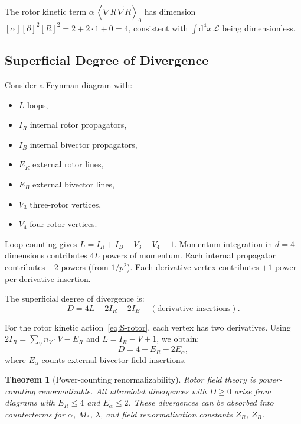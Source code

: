 \documentclass[11pt,a4paper]{article}
\numberwithin{equation}{section}
\theoremstyle{plain}
\newtheorem{theorem}{Theorem}[section]
\theoremstyle{definition}
\theoremstyle{remark}
\newcommand{\dd}{\mathrm{d}}
\newcommand{\rev}[1]{\widetilde{#1}}        %
\newcommand{\grade}[2]{\left\langle #1 \right\rangle_{#2}}
\newcommand{\Lag}{\mathcal{L}}              %
\begin{document}
The rotor kinetic term $\alpha\,\grade{\nabla R\,\rev{\nabla R}}{0}$ has dimension $[\alpha][\partial]^2[R]^2 = 2+2\cdot 1 + 0 = 4$, consistent with $\int \dd^4x\,\Lag$ being dimensionless.

\subsection{Superficial Degree of Divergence}

Consider a Feynman diagram with:
\begin{itemize}
  \item $L$ loops,
  \item $I_R$ internal rotor propagators,
  \item $I_B$ internal bivector propagators,
  \item $E_R$ external rotor lines,
  \item $E_B$ external bivector lines,
  \item $V_3$ three-rotor vertices,
  \item $V_4$ four-rotor vertices.
\end{itemize}

Loop counting gives $L = I_R + I_B - V_3 - V_4 + 1$. Momentum integration in $d=4$ dimensions contributes $4L$ powers of momentum. Each internal propagator contributes $-2$ powers (from $1/p^2$). Each derivative vertex contributes $+1$ power per derivative insertion.

The superficial degree of divergence is:
\begin{equation}
D = 4L - 2I_R - 2I_B + (\text{derivative insertions}).
\label{eq:D-general}
\end{equation}

For the rotor kinetic action~\eqref{eq:S-rotor}, each vertex has two derivatives. Using $2I_R = \sum_V n_V \cdot V - E_R$ and $L=I_R-V+1$, we obtain:
\begin{equation}
D = 4 - E_R - 2E_\alpha,
\label{eq:D-rotor}
\end{equation}
where $E_\alpha$ counts external bivector field insertions.

\begin{theorem}[Power-counting renormalizability]
Rotor field theory is power-counting renormalizable. All ultraviolet divergences with $D\geq 0$ arise from diagrams with $E_R\leq 4$ and $E_\alpha\leq 2$. These divergences can be absorbed into counterterms for $\alpha$, $M_*$, $\lambda$, and field renormalization constants $Z_R$, $Z_B$.
\end{theorem}
\end{document}
